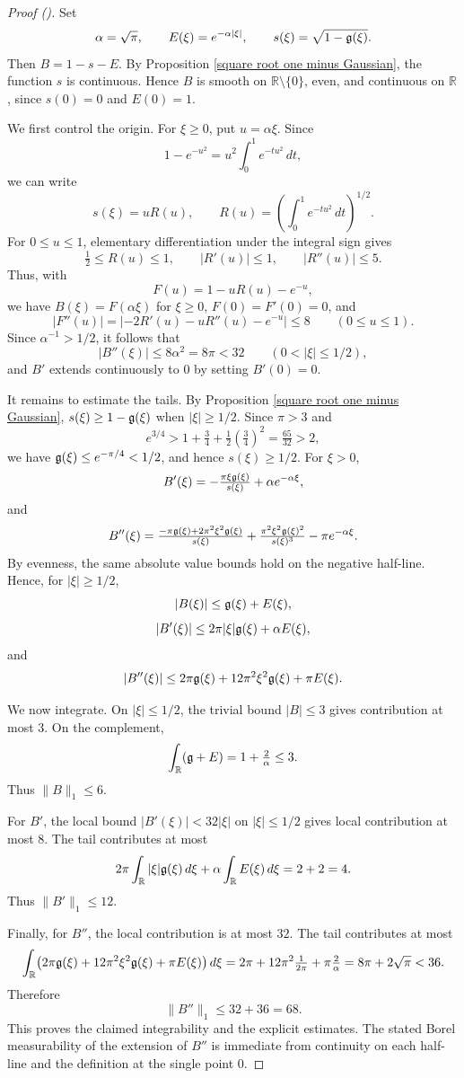\documentclass[12pt,reqno]{amsart}
\newcommand{\auto}{{({\tiny\faCar})}}
\theoremstyle{plain}
\numberwithin{equation}{section}
\theoremstyle{remark}
\newcommand{\R}{{\mathbb R}}
\begin{document}
\begin{proof}[Proof \auto]
Set
\[
    \alpha=\sqrt{\pi},\qquad
    E(\xi)=e^{-\alpha|\xi|},\qquad
    s(\xi)=\sqrt{1-\mathfrak{g}(\xi)}.
\]
Then \(B=1-s-E\). By Proposition \ref{square root one minus Gaussian}, the function $s$ is continuous. Hence \(B\) is smooth on \(\R\setminus\{0\}\), even, and continuous on \(\R\), since \(s(0)=0\) and \(E(0)=1\).

We first control the origin. For \(\xi\ge0\), put \(u=\alpha \xi\). Since
\[
    1-e^{-u^2}=u^2\int_0^1 e^{-tu^2}\,dt,
\]
we can write
\[
    s(\xi)=uR(u),\qquad
    R(u)=\left(\int_0^1 e^{-tu^2}\,dt\right)^{1/2}.
\]
For \(0\le u\le1\), elementary differentiation under the integral sign gives
\[
    \tfrac12\le R(u)\le1,\qquad |R'(u)|\le1,\qquad |R''(u)|\le5.
\]
Thus, with
\[
    F(u)=1-uR(u)-e^{-u},
\]
we have \(B(\xi)=F(\alpha\xi)\) for \(\xi\ge0\), \(F(0)=F'(0)=0\), and
\[
    |F''(u)|
    =
    |-2R'(u)-uR''(u)-e^{-u}|
    \le 8
    \qquad (0\le u\le1).
\]
Since \(\alpha^{-1}>1/2\), it follows that
\[
    |B''(\xi)|\le 8\alpha^2=8\pi<32
    \qquad (0<|\xi|\le1/2),
\]
and \(B'\) extends continuously to \(0\) by setting \(B'(0)=0\).

It remains to estimate the tails. By Proposition \ref{square root one minus Gaussian},
$s(\xi)\ge1-\mathfrak{g}(\xi)$ when $|\xi|\ge1/2$. Since $\pi>3$ and
\[
e^{3/4}>1+\tfrac34+\tfrac12\left(\tfrac34\right)^2=\tfrac{65}{32}>2,
\]
we have $\mathfrak{g}(\xi)\le e^{-\pi/4}<1/2$, and hence $s(\xi)\ge1/2$. For \(\xi>0\),
\[
    B'(\xi)
    =
    -\tfrac{\pi\xi\mathfrak{g}(\xi)}{s(\xi)}
    +
    \alpha e^{-\alpha\xi},
\]
and
\[
    B''(\xi)
    =
    \tfrac{-\pi\mathfrak{g}(\xi)+2\pi^2\xi^2\mathfrak{g}(\xi)}{s(\xi)}
    +
    \tfrac{\pi^2\xi^2\mathfrak{g}(\xi)^2}{s(\xi)^3}
    -
    \pi e^{-\alpha\xi}.
\]
By evenness, the same absolute value bounds hold on the negative half-line. Hence, for
\(|\xi|\ge1/2\),
\[
    |B(\xi)|\le \mathfrak{g}(\xi)+E(\xi),
\]
\[
    |B'(\xi)|\le 2\pi|\xi|\mathfrak{g}(\xi)+\alpha E(\xi),
\]
and
\[
    |B''(\xi)|
    \le
    2\pi\mathfrak{g}(\xi)+12\pi^2\xi^2\mathfrak{g}(\xi)+\pi E(\xi).
\]

We now integrate. On \(|\xi|\le1/2\), the trivial bound \(|B|\le3\) gives contribution at
most \(3\). On the complement,
\[
    \int_\R(\g+E)
    =
    1+\tfrac{2}{\alpha}
    \le3.
\]
Thus \(\|B\|_1\le6\).

For \(B'\), the local bound \(|B'(\xi)|<32|\xi|\) on \(|\xi|\le1/2\) gives local
contribution at most \(8\). The tail contributes at most
\[
    2\pi\int_\R |\xi|\g(\xi)\,d\xi
    +
    \alpha\int_\R E(\xi)\,d\xi
    =
    2+2=4.
\]
Thus \(\|B'\|_1\le12\).

Finally, for \(B''\), the local contribution is at most \(32\). The tail contributes at most
\[
\int_\R \bigl(2\pi\g(\xi)+12\pi^2\xi^2\g(\xi)+\pi E(\xi)\bigr)\,d\xi = 2\pi+12\pi^2\tfrac{1}{2\pi}+\pi\tfrac{2}{\alpha} = 8\pi+2\sqrt{\pi}<36.
\]
Therefore
\[
    \|B''\|_1\le 32+36=68.
\]
This proves the claimed integrability and the explicit estimates. The stated Borel measurability
of the extension of \(B''\) is immediate from continuity on each half-line and the definition at
the single point \(0\).
\end{proof}
\end{document}
